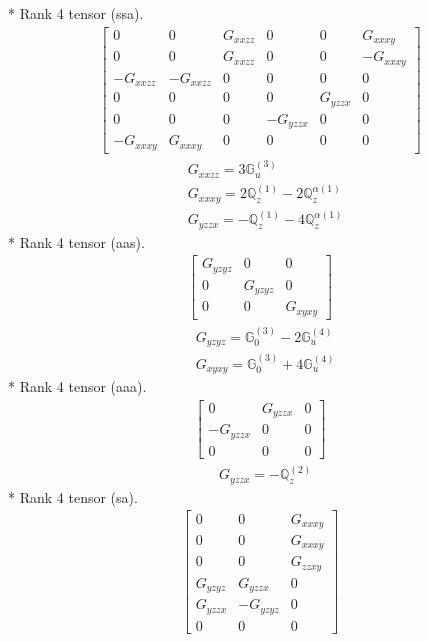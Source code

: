 \documentclass[fleqn,8pt,landscape]{jsarticle}
\begin{document}
* Rank 4 tensor (ssa).
\begin{align*}
\begin{bmatrix} 0 & 0 & G_{xxzz} & 0 & 0 & G_{xxxy} \\ 0 & 0 & G_{xxzz} & 0 & 0 & - G_{xxxy} \\ - G_{xxzz} & - G_{xxzz} & 0 & 0 & 0 & 0 \\ 0 & 0 & 0 & 0 & G_{yzzx} & 0 \\ 0 & 0 & 0 & - G_{yzzx} & 0 & 0 \\ - G_{xxxy} & G_{xxxy} & 0 & 0 & 0 & 0 \end{bmatrix}
\end{align*}
\begin{align*}
& G_{xxzz} = 3 \mathbb{G}_{u}^{(3)} \\
& G_{xxxy} = 2 \mathbb{Q}_{z}^{(1)} - 2 \mathbb{Q}_{z}^{\alpha(1)} \\
& G_{yzzx} = - \mathbb{Q}_{z}^{(1)} - 4 \mathbb{Q}_{z}^{\alpha(1)}
\end{align*}
* Rank 4 tensor (aas).
\begin{align*}
\begin{bmatrix} G_{yzyz} & 0 & 0 \\ 0 & G_{yzyz} & 0 \\ 0 & 0 & G_{xyxy} \end{bmatrix}
\end{align*}
\begin{align*}
& G_{yzyz} = \mathbb{G}_{0}^{(3)} - 2 \mathbb{G}_{u}^{(4)} \\
& G_{xyxy} = \mathbb{G}_{0}^{(3)} + 4 \mathbb{G}_{u}^{(4)}
\end{align*}
* Rank 4 tensor (aaa).
\begin{align*}
\begin{bmatrix} 0 & G_{yzzx} & 0 \\ - G_{yzzx} & 0 & 0 \\ 0 & 0 & 0 \end{bmatrix}
\end{align*}
\begin{align*}
& G_{yzzx} = - \mathbb{Q}_{z}^{(2)}
\end{align*}
* Rank 4 tensor (sa).
\begin{align*}
\begin{bmatrix} 0 & 0 & G_{xxxy} \\ 0 & 0 & G_{xxxy} \\ 0 & 0 & G_{zzxy} \\ G_{yzyz} & G_{yzzx} & 0 \\ G_{yzzx} & - G_{yzyz} & 0 \\ 0 & 0 & 0 \end{bmatrix}
\end{align*}
\end{document}
